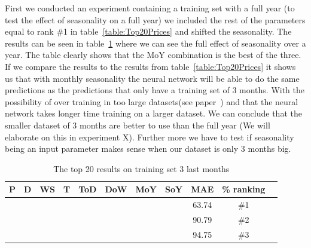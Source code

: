 First we conducted an experiment containing a training set with a full year (to test the effect of seasonality on a full year) we included the rest of the parameters equal to rank \#1 in table~\ref{table:Top20Prices} and shifted the seasonality. The results can be seen in table~\ref{table:1YearTrain} where we can see the full effect of seasonality over a year. The table clearly shows that the MoY combination is the best of the three. If we compare the results to the results from table~\ref{table:Top20Prices} it shows us that with monthly seasonality the neural network will be able to do the same predictions as the predictions that only have a training set of 3 months. With the possibility of over training in too large datasets(see paper~\cite{1}) and that the neural network takes longer time training on a larger dataset. We can conclude that the smaller dataset of 3 months are better to use than the full year (We will elaborate on this in experiment X). Further more we have to test if seasonality being an input parameter makes sense when our dataset is only 3 months big.

\begin{table}[H]
\centering  %
\begin{tabular}{|c|c|c|c|c|c|c|c|c|c|c|} %
\hline
P & D & WS & T & ToD & DoW & MoY & SoY & MAE & \% ranking\\ [0.5ex] %
\hline
\x    & \x    & \x    & \x    & \x\m  & \x\m  & \x\m  &       & 63.74 & \#1 \\ \hline
\x    & \x    & \x    & \x    & \x\m  & \x\m  &       &       & 90.79 & \#2 \\ \hline
\x    & \x    & \x    & \x    & \x\m  & \x\m  &       & \x\m  & 94.75 & \#3 \\ \hline
\end{tabular}
\caption{The top 20 results on training set 3 last months} %
\label{table:1YearTrain} %
\end{table}


